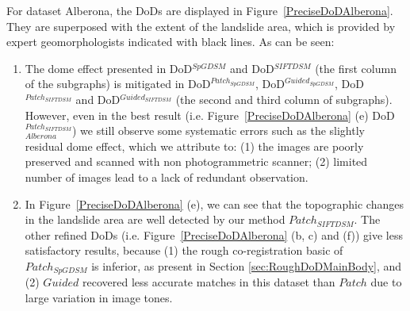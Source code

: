For dataset Alberona, the \ac{DoD}s are displayed in Figure~\ref{PreciseDoDAlberona}. They are superposed with the extent of the landslide area, which is provided by expert geomorphologists indicated with black lines. As can be seen:\\
\begin{enumerate}
	\item The dome effect presented in DoD$^{SpGDSM}$ and DoD$^{SIFTDSM}$ (the first column of the subgraphs) is mitigated in DoD$^{Patch_{SpGDSM}}$, DoD$^{Guided_{SpGDSM}}$, DoD$^{Patch_{SIFTDSM}}$ and DoD$^{Guided_{SIFTDSM}}$ (the second and third column of subgraphs). However, even in the best result (i.e. Figure~\ref{PreciseDoDAlberona} (e) \ac{DoD}$_{Alberona}^{Patch_{SIFTDSM}}$) we still observe some systematic errors such as the slightly residual dome effect, which we attribute to: (1) the images are poorly preserved and scanned with non photogrammetric scanner; (2) limited number of images lead to a lack of redundant observation.
	\item In Figure~\ref{PreciseDoDAlberona} (e), we can see that the topographic changes in the landslide area are well detected by our method ${Patch_{SIFTDSM}}$. The other refined \ac{DoD}s (i.e. Figure~\ref{PreciseDoDAlberona} (b, c) and (f)) give less satisfactory results, because (1) the rough co-registration basic of ${Patch_{SpGDSM}}$ is inferior, as present in Section \ref{sec:RoughDoDMainBody}, and (2) $Guided$ recovered less accurate matches in this dataset than $Patch$ due to large variation in image tones.
\end{enumerate}



